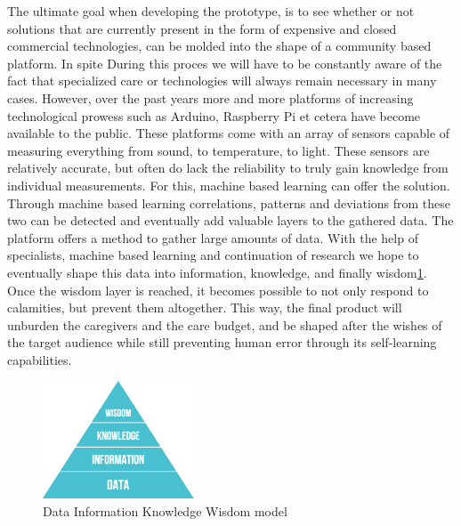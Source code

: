 \documentclass{below-ext}
\begin{document}
The ultimate goal when developing the prototype, is to see whether or not solutions that are currently present in the form of expensive and closed commercial technologies, can be molded into the shape of a community based platform. In spite During this proces we will have to be constantly aware of the fact that specialized care or technologies will always remain necessary in many cases. However, over the past years more and more platforms of increasing technological prowess such as Arduino, Raspberry Pi et cetera have become available to the public. These platforms come with an array of sensors capable of measuring everything from sound, to temperature, to light. These sensors are relatively accurate, but often do lack the reliability to truly gain knowledge from individual measurements. For this, machine based learning can offer the solution. Through machine based learning correlations, patterns and deviations from these two can be detected and eventually add valuable layers to the gathered data. The platform offers a method to gather large amounts of data. With the help of specialists, machine based learning and continuation of research we hope to eventually shape this data into information, knowledge, and finally wisdom\ref{fig:dikw}. Once the wisdom layer is reached, it becomes possible to not only respond to calamities, but prevent them altogether. This way, the final product will unburden the caregivers and the care budget, and  be shaped after the wishes of the target audience  while still preventing human error through its self-learning capabilities.

\begin{figure}
\centering
\label{fig:dikw}
\includegraphics[width=0.4\textwidth]{dikw}
\caption{Data Information Knowledge Wisdom model}
\end{figure}

\end{document}
